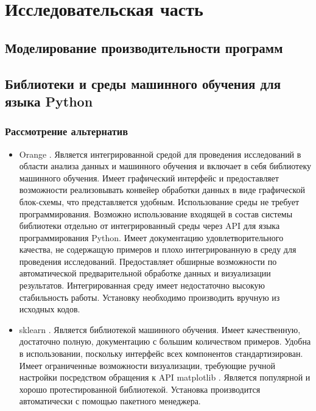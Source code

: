 \section{Исследовательская часть}

\subsection{Моделирование производительности программ}

\subsection{Библиотеки и среды машинного обучения для языка Python}

\subsubsection{Рассмотрение альтернатив}

\begin{itemize}

\item Orange \cite{orange}. Является интегрированной средой для проведения исследований в области анализа данных и машинного обучения и включает в себя библиотеку машинного обучения. Имеет графический интерфейс и предоставляет возможности реализовывать конвейер обработки данных в виде графической блок-схемы, что представляется удобным. Использование среды не требует программирования. Возможно использование входящей в состав системы библиотеки отдельно от интегрированный среды через API \cite{api} для языка программирования Python. Имеет документацию удовлетворительного качества, не содержащую примеров и плохо интегрированную в среду для проведения исследований. Предоставляет обширные возможности по автоматической предварительной обработке данных и визуализации результатов. Интегрированная среду имеет недостаточно высокую стабильность работы. Установку необходимо производить вручную из исходных кодов.
\item sklearn \cite{sklearn}. Является библиотекой машинного обучения. Имеет качественную, достаточно полную, документацию с большим количеством примеров. Удобна в использовании, поскольку интерфейс всех компонентов стандартизирован. Имеет ограниченные возможности визуализации, требующие ручной настройки посредством обращения к API matplotlib \cite{matplotlib}. Является популярной и хорошо протестированной библиотекой. Установка производится автоматически с помощью пакетного менеджера.

\end{itemize}

